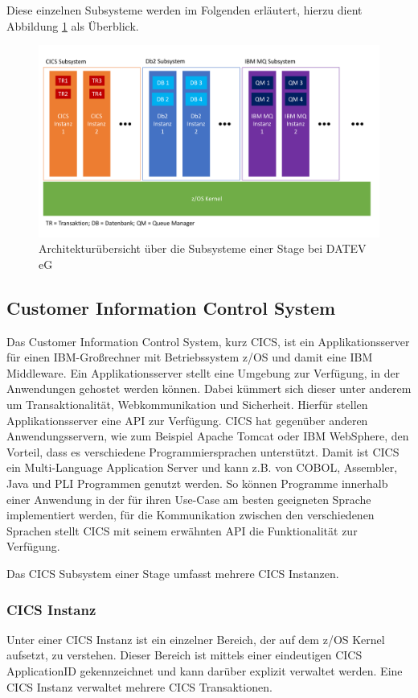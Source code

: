 Diese einzelnen Subsysteme werden im Folgenden erläutert, hierzu dient Abbildung \ref{fig:archüber} als Überblick.

\begin{figure}[h!]
\centering
\includegraphics[width=\textwidth]{figures/architektur.pdf}
\caption{Architekturübersicht über die Subsysteme einer Stage bei DATEV eG}
\label{fig:archüber}
\end{figure}

\subsection{Customer Information Control System}\label{cics}
Das Customer Information Control System, kurz CICS, ist ein Applikationsserver für einen IBM-Großrechner mit Betriebssystem z/OS und damit eine IBM Middleware.
Ein Applikationsserver stellt eine Umgebung zur Verfügung, in der Anwendungen gehostet werden können.
Dabei kümmert sich dieser unter anderem um Transaktionalität, Webkommunikation und Sicherheit.
Hierfür stellen Applikationsserver eine API zur Verfügung.
CICS hat gegenüber anderen Anwendungsservern, wie zum Beispiel \glqq Apache Tomcat\grqq{} oder \glqq IBM WebSphere\grqq,  den Vorteil, dass es verschiedene Programmiersprachen unterstützt.
Damit ist CICS ein Multi-Language Application Server und kann z.B. von COBOL, Assembler, Java und PLI Programmen genutzt werden.
So können Programme innerhalb einer Anwendung in der für ihren Use-Case am besten geeigneten Sprache implementiert werden, für die Kommunikation zwischen den verschiedenen Sprachen stellt  CICS mit seinem erwähnten API die Funktionalität zur Verfügung.
\cite{Rayns.2011}

Das CICS Subsystem einer Stage umfasst mehrere CICS Instanzen.

\subsubsection{CICS Instanz} 
Unter einer CICS Instanz ist ein einzelner Bereich, der auf dem z/OS Kernel aufsetzt, zu verstehen.
Dieser Bereich ist mittels einer eindeutigen CICS ApplicationID gekennzeichnet und kann darüber explizit verwaltet werden.
Eine CICS Instanz verwaltet mehrere CICS Transaktionen.

